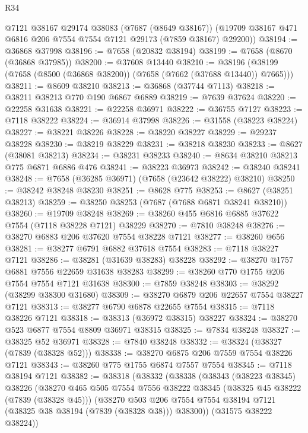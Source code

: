 \begin{lexlean}{R34}
\begin{coremodule}
      @7121
      @38167
      @29174
      @38083
      (@7687 (@8649 @38167))
      (@19709 @38167 @471 @6816 @206 @7554 @7554 @7121 @29173 (@7859 @38167) @29200))
@38194 := @36868 @37998
@38196 := @7658 (@20832 @38194)
@38199 := @7658 (@8670 (@36868 @37985))
@38200 := @37608 @13440
@38210 := @38196 (@38199 (@7658 (@8500 (@36868 @38200)) (@7658 (@7662 (@37688 @13440)) @7665)))
@38211 := @8609 @38210
@38213 := @36868 (@37744 @7113)
@38218 := @38211 @38213 @770 @190 @6867 @6889
@38219 := @7639 @37624
@38220 := @22258 @31638
@38221 := @22258 @36971
@38222 := @36755 @7127
@38223 := @7118 @38222
@38224 := @36914 @37998
@38226 := @31558 (@38223 @38224)
@38227 := @38221 @38226
@38228 := @38220 @38227
@38229 := @29237 @38228
@38230 := @38219 @38229
@38231 := @38218 @38230
@38233 := @8627 (@38081 @38213)
@38234 := @38231 @38233
@38240 := @8634 @38210 @38213 @775 @6871 @6886 @476
@38241 := @38223 @36973
@38242 := @38240 @38241
@38248 := @7658 (@36285 @36971) (@7658 (@23642 @38222) @38210)
@38250 := @38242 @38248 @38230
@38251 := @8628 @775
@38253 := @8627 (@38251 @38213)
@38259 := @38250 @38253 (@7687 (@7688 @6871 @38241 @38210))
@38260 := @19709 @38248
@38269 := @38260 @455 @6816 @6885 @37622 @7554 (@7118 @38228 @7121) @38229
@38270 := @7810 @38248
@38276 := @38270 @6883 @206 @37620 @7554 @38228 @7121
@38277 := @38260 @656
@38281 := @38277 @6791 @6882 @37618 @7554
@38283 := @7118 @38227 @7121
@38286 := @38281 (@31639 @38283) @38228
@38292 := @38270 @1757 @6881 @7556 @22659 @31638 @38283
@38299 := @38260 @770 @1755 @206 @7554 @7554 @7121 @31638
@38300 := @7859 @38248
@38303 := @38292 (@38299 @38300 @31680)
@38309 := @38270 @6879 @206 @22657 @7554 @38227 @7121
@38313 := @38277 @6790 @6878 @22655 @7554
@38315 := @7118 @38226 @7121
@38318 := @38313 (@36972 @38315) @38227
@38324 := @38270 @523 @6877 @7554 @8809 @36971 @38315
@38325 := @7834 @38248
@38327 := @38325 @52 @36971
@38328 := @7840 @38248
@38332 := @38324 (@38327 (@7839 (@38328 @52)))
@38338 := @38270 @6875 @206 @7559 @7554 @38226 @7121
@38343 := @38260 @775 @1755 @6874 @7557 @7554
@38345 := @7118 @38194 @7121
@38382 := @38318
    (@38332
      (@38338
        (@38343
          (@38223 @38345)
          @38226
          (@38270
            @465
            @505
            @7554
            @7556
            @38222
            @38345
            (@38325 @45 @38222 (@7839 (@38328 @45)))
            (@38270
              @503
              @206
              @7554
              @7554
              @38194
              @7121
              (@38325 @38 @38194 (@7839 (@38328 @38)))
              @38300))
          (@31575 @38222 @38224))

\end{coremodule}
\end{lexlean}
